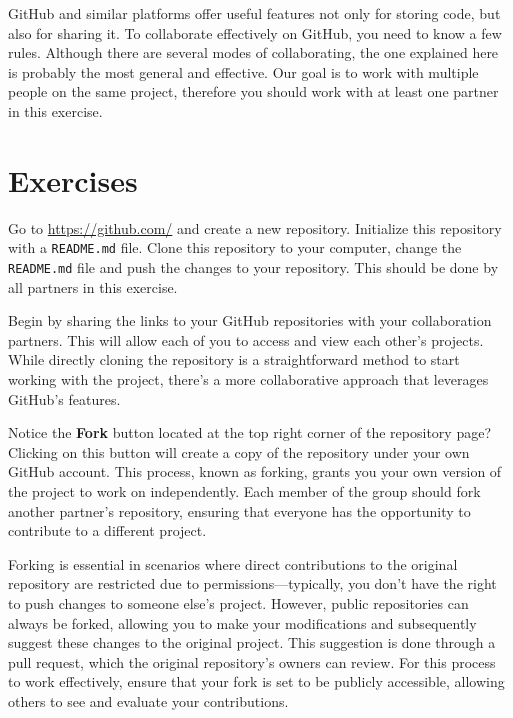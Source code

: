 \documentclass{dcbl/challenge}
\begin{document}
GitHub and similar platforms offer useful features not only for storing code, but also for sharing it.
To collaborate effectively on GitHub, you need to know a few rules.
Although there are several modes of collaborating, the one explained here is probably the most general and effective.
Our goal is to work with multiple people on the same project, therefore you should work with at least one partner in this exercise.

\section*{Exercises}
\begin{aufgabe}
    Go to \url{https://github.com/} and create a new repository.
    Initialize this repository with a \texttt{README.md} file.
    Clone this repository to your computer, change the \texttt{README.md} file and push the changes to your repository.
    This should be done by all partners in this exercise.
\end{aufgabe}

\begin{aufgabe}
   Begin by sharing the links to your GitHub repositories with your collaboration partners. This will allow each of you to access and view each other's projects. While directly cloning the repository is a straightforward method to start working with the project, there's a more collaborative approach that leverages GitHub's features.
    
    Notice the \textbf{Fork} button located at the top right corner of the repository page? Clicking on this button will create a copy of the repository under your own GitHub account. This process, known as forking, grants you your own version of the project to work on independently. Each member of the group should fork another partner's repository, ensuring that everyone has the opportunity to contribute to a different project.
    
    Forking is essential in scenarios where direct contributions to the original repository are restricted due to permissions—typically, you don't have the right to push changes to someone else's project. However, public repositories can always be forked, allowing you to make your modifications and subsequently suggest these changes to the original project. This suggestion is done through a pull request, which the original repository's owners can review. For this process to work effectively, ensure that your fork is set to be publicly accessible, allowing others to see and evaluate your contributions.
\end{aufgabe}
\end{document}
